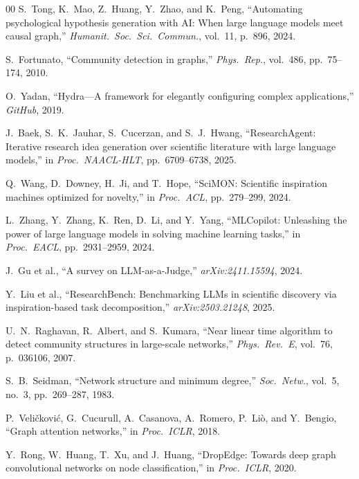 \documentclass[conference]{IEEEtran}
\begin{document}
\begin{thebibliography}{00}
 S.~Tong, K.~Mao, Z.~Huang, Y.~Zhao, and K.~Peng, ``Automating psychological hypothesis generation with AI: When large language models meet causal graph,'' \textit{Humanit.\ Soc.\ Sci.\ Commun.}, vol.~11, p.~896, 2024.

 S.~Fortunato, ``Community detection in graphs,'' \textit{Phys.\ Rep.}, vol.~486, pp.~75--174, 2010.

 O.~Yadan, ``Hydra---A framework for elegantly configuring complex applications,'' \textit{GitHub}, 2019.

 J.~Baek, S.~K.~Jauhar, S.~Cucerzan, and S.~J.~Hwang, ``ResearchAgent: Iterative research idea generation over scientific literature with large language models,'' in \textit{Proc.\ NAACL-HLT}, pp.~6709--6738, 2025.

 Q.~Wang, D.~Downey, H.~Ji, and T.~Hope, ``SciMON: Scientific inspiration machines optimized for novelty,'' in \textit{Proc.\ ACL}, pp.~279--299, 2024.

 L.~Zhang, Y.~Zhang, K.~Ren, D.~Li, and Y.~Yang, ``MLCopilot: Unleashing the power of large language models in solving machine learning tasks,'' in \textit{Proc.\ EACL}, pp.~2931--2959, 2024.

 J.~Gu et al., ``A survey on LLM-as-a-Judge,'' \textit{arXiv:2411.15594}, 2024.

 Y.~Liu et al., ``ResearchBench: Benchmarking LLMs in scientific discovery via inspiration-based task decomposition,'' \textit{arXiv:2503.21248}, 2025.

 U.~N.~Raghavan, R.~Albert, and S.~Kumara, ``Near linear time algorithm to detect community structures in large-scale networks,'' \textit{Phys.\ Rev.\ E}, vol.~76, p.~036106, 2007.

 S.~B.~Seidman, ``Network structure and minimum degree,'' \textit{Soc.\ Netw.}, vol.~5, no.~3, pp.~269--287, 1983.

 P.~Veli\v{c}kovi\'{c}, G.~Cucurull, A.~Casanova, A.~Romero, P.~Li\`{o}, and Y.~Bengio, ``Graph attention networks,'' in \textit{Proc.\ ICLR}, 2018.

 Y.~Rong, W.~Huang, T.~Xu, and J.~Huang, ``DropEdge: Towards deep graph convolutional networks on node classification,'' in \textit{Proc.\ ICLR}, 2020.


\end{thebibliography}
\end{document}
